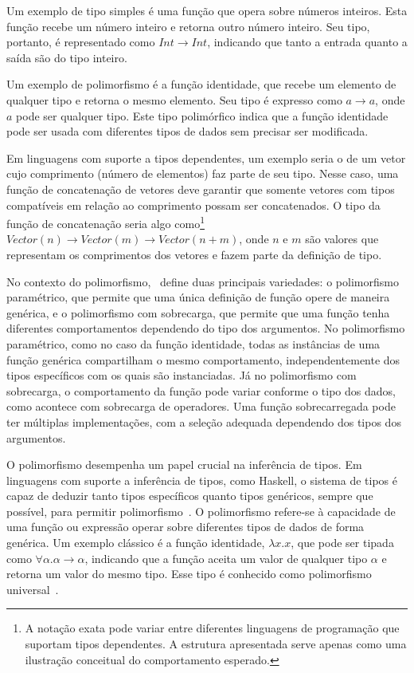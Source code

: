 Um exemplo de tipo simples é uma função que opera sobre números inteiros.
Esta função recebe um número inteiro e retorna outro número inteiro.
Seu tipo, portanto, é representado como $Int \rightarrow Int$, indicando que tanto a entrada quanto a saída são do tipo inteiro.

Um exemplo de polimorfismo é a função identidade, que recebe um elemento de qualquer tipo e retorna o mesmo elemento.
Seu tipo é expresso como $a \rightarrow a$, onde $a$ pode ser qualquer tipo.
Este tipo polimórfico indica que a função identidade pode ser usada com diferentes tipos de dados sem precisar ser modificada.

Em linguagens com suporte a tipos dependentes, um exemplo seria o de um vetor cujo comprimento (número de elementos) faz parte de seu tipo.
Nesse caso, uma função de concatenação de vetores deve garantir que somente vetores com tipos compatíveis em relação ao comprimento possam ser concatenados.
O tipo da função de concatenação seria algo como\footnote{A notação exata pode variar entre diferentes linguagens de programação que suportam tipos dependentes. A estrutura apresentada serve apenas como uma ilustração conceitual do comportamento esperado.} $Vector(n) \rightarrow Vector(m) \rightarrow Vector(n+m)$, onde $n$ e $m$ são valores que representam os comprimentos dos vetores e fazem parte da definição de tipo.

No contexto do polimorfismo,~ define duas principais variedades: o polimorfismo paramétrico, que permite que uma única definição de função opere de maneira genérica, e o polimorfismo com sobrecarga, que permite que uma função tenha diferentes comportamentos dependendo do tipo dos argumentos.
No polimorfismo paramétrico, como no caso da função identidade, todas as instâncias de uma função genérica compartilham o mesmo comportamento, independentemente dos tipos específicos com os quais são instanciadas.
Já no polimorfismo com sobrecarga, o comportamento da função pode variar conforme o tipo dos dados, como acontece com sobrecarga de operadores. Uma função sobrecarregada pode ter múltiplas implementações, com a seleção adequada dependendo dos tipos dos argumentos.

O polimorfismo desempenha um papel crucial na inferência de tipos.
Em linguagens com suporte a inferência de tipos, como Haskell, o sistema de tipos é capaz de deduzir tanto tipos específicos quanto tipos genéricos, sempre que possível, para permitir polimorfismo~\cite{PIERCE2002}.
O polimorfismo refere-se à capacidade de uma função ou expressão operar sobre diferentes tipos de dados de forma genérica.
Um exemplo clássico é a função identidade, $\lambda x.x$, que pode ser tipada como $\forall \alpha. \alpha \to \alpha$, indicando que a função aceita um valor de qualquer tipo $\alpha$ e retorna um valor do mesmo tipo.
Esse tipo é conhecido como polimorfismo universal~\cite{PIERCE2002}.

